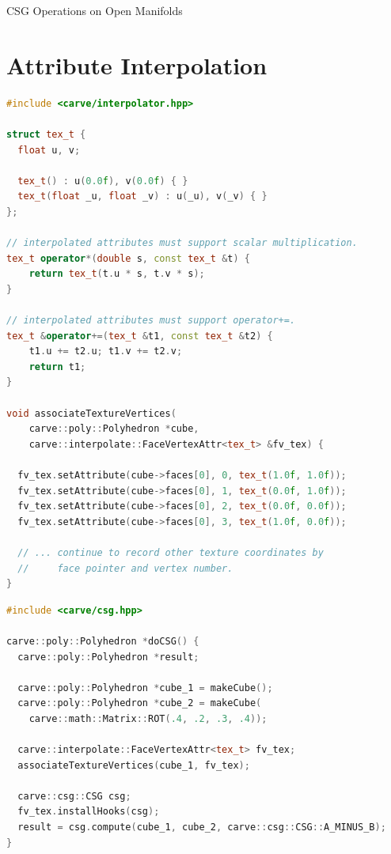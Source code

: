 \documentclass{carve}
\begin{document}
\begin{section}{CSG Operations on Open Manifolds}

\end{section}

\chapter{Attribute Interpolation}

\begin{lstlisting}[float,language=C++,caption=Associating texture coordinates with a cube]
#include <carve/interpolator.hpp>

struct tex_t {
  float u, v;

  tex_t() : u(0.0f), v(0.0f) { }
  tex_t(float _u, float _v) : u(_u), v(_v) { }
};

// interpolated attributes must support scalar multiplication.
tex_t operator*(double s, const tex_t &t) {
    return tex_t(t.u * s, t.v * s);
}

// interpolated attributes must support operator+=.
tex_t &operator+=(tex_t &t1, const tex_t &t2) {
    t1.u += t2.u; t1.v += t2.v;
    return t1;
}

void associateTextureVertices(
    carve::poly::Polyhedron *cube,
    carve::interpolate::FaceVertexAttr<tex_t> &fv_tex) {

  fv_tex.setAttribute(cube->faces[0], 0, tex_t(1.0f, 1.0f));
  fv_tex.setAttribute(cube->faces[0], 1, tex_t(0.0f, 1.0f));
  fv_tex.setAttribute(cube->faces[0], 2, tex_t(0.0f, 0.0f));
  fv_tex.setAttribute(cube->faces[0], 3, tex_t(1.0f, 0.0f));

  // ... continue to record other texture coordinates by
  //     face pointer and vertex number.
}
\end{lstlisting}

\begin{lstlisting}[float,language=C++,caption=Interpolating texture coordinates during a CSG operation]
#include <carve/csg.hpp>

carve::poly::Polyhedron *doCSG() {
  carve::poly::Polyhedron *result;

  carve::poly::Polyhedron *cube_1 = makeCube();
  carve::poly::Polyhedron *cube_2 = makeCube(
    carve::math::Matrix::ROT(.4, .2, .3, .4));

  carve::interpolate::FaceVertexAttr<tex_t> fv_tex;
  associateTextureVertices(cube_1, fv_tex);

  carve::csg::CSG csg;
  fv_tex.installHooks(csg);
  result = csg.compute(cube_1, cube_2, carve::csg::CSG::A_MINUS_B);
}
\end{lstlisting}

\appendix

\backmatter
\end{document}
